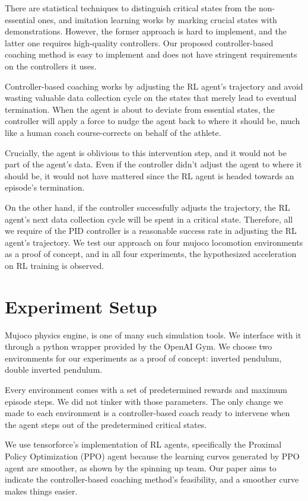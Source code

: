 There are statistical techniques to distinguish critical states from the non-essential ones, and imitation learning works by marking crucial states with demonstrations. However, the former approach is hard to implement, and the latter one requires high-quality controllers. Our proposed controller-based coaching method is easy to implement and does not have stringent requirements on the controllers it uses.

Controller-based coaching works by adjusting the RL agent's trajectory and avoid wasting valuable data collection cycle on the states that merely lead to eventual termination. When the agent is about to deviate from essential states, the controller will apply a force to nudge the agent back to where it should be, much like a human coach course-corrects on behalf of the athlete. 

Crucially, the agent is oblivious to this intervention step, and it would not be part of the agent's data. Even if the controller didn't adjust the agent to where it should be, it would not have mattered since the RL agent is headed towards an episode's termination. 

On the other hand, if the controller successfully adjusts the trajectory, the RL agent's next data collection cycle will be spent in a critical state. Therefore, all we require of the PID controller is a reasonable success rate in adjusting the RL agent's trajectory. We test our approach on four mujoco locomotion environments as a proof of concept, and in all four experiments, the hypothesized acceleration on RL training is observed.

\section{Experiment Setup}
Mujoco physics engine\cite{6386109}, is one of many such simulation tools. We interface with it through a python wrapper provided by the OpenAI Gym\cite{Brockman2016OpenAIG}. We choose two environments for our experiments as a proof of concept: inverted pendulum, double inverted pendulum. 

Every environment comes with a set of predetermined rewards and maximum episode steps. We did not tinker with those parameters. The only change we made to each environment is a controller-based coach ready to intervene when the agent steps out of the predetermined critical states.

We use tensorforce's\cite{tensorforce} implementation of RL agents, specifically the Proximal Policy Optimization (PPO) agent because the learning curves generated by PPO agent are smoother, as shown by the spinning up\cite{SpinningUp2018} team. Our paper aims to indicate the controller-based coaching method's feasibility, and a smoother curve makes things easier. 

